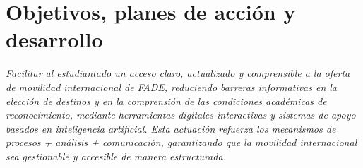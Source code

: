 \documentclass[11pt,a4paper]{scrreprt}
\begin{document}
\section{Objetivos, planes de acción y desarrollo}
\newpage
{}
{\small\color{mutedcolor}\itshape Facilitar al estudiantado un acceso claro, actualizado y comprensible a la oferta de movilidad internacional de FADE, reduciendo barreras informativas en la elección de destinos y en la comprensión de las condiciones académicas de reconocimiento, mediante herramientas digitales interactivas y sistemas de apoyo basados en inteligencia artificial. Esta actuación refuerza los mecanismos de procesos + análisis + comunicación, garantizando que la movilidad internacional sea gestionable y accesible de manera estructurada. }\par\vspace{6pt}
\end{document}
